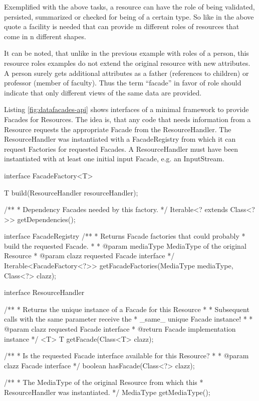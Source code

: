 \documentclass[12pt,a4paper,twoside]{scrartcl}		%
\begin{document}
Exemplified with the above tasks, a resource can have the role of being
validated, persisted, summarized or checked for being of a certain type. So like
in the above quote a facility is needed that can provide m different roles of
resources that come in n different shapes.

It can be noted, that unlike in the previous example with roles of a person,
this resource roles examples do not extend the original resource with new
attributes. A person surely gets additional attributes as a father (references
to children) or professor (member of faculty). Thus the term ``facade'' in favor
of role should indicate that only different views of the same data are provided.

Listing \ref{fig:datafacades-api} shows interfaces of a minimal framework to
provide Facades for Resources. The idea is, that any code that needs information
from a Resource requests the appropriate Facade from the ResourceHandler. The
ResourceHandler was instantiated with a FacadeRegistry from which it can request
Factories for requested Facades. A ResourceHandler must have been instantiated
with at least one initial input Facade, e.g. an InputStream.

\begin{javalisting}[label=fig:datafacades-api,
                    float=p,
                   caption={API of the ResourceFacades component}]
interface FacadeFactory<T> {
 T build(ResourceHandler resourceHandler);

 /**
  * Dependency Facades needed by this factory.
  */
 Iterable<? extends Class<?>> getDependencies();
}

interface FacadeRegistry {
 /**
  * Returns Facade factories that could probably
  * build the requested Facade.
  *
  * @param mediaType MediaType of the original Resource
  * @param clazz requested Facade interface
  */
 Iterable<FacadeFactory<?>> getFacadeFactories(MediaType mediaType,
                                               Class<?> clazz);
}

interface ResourceHandler {
 /**
  * Returns the unique instance of a Facade for this Resource
  *
  * Subsequent calls with the same parameter receive the
  * _same_ unique Facade instance!
  *
  * @param clazz requested Facade interface
  * @return Facade implementation instance
  */
 <T> T getFacade(Class<T> clazz);

 /**
  * Is the requested Facade interface available for this Resource?
  *
  * @param clazz Facade interface
  */
 boolean hasFacade(Class<?> clazz);

 /**
  * The MediaType of the original Resource from which this 
  * ResourceHandler was instantiated.
  */
 MediaType getMediaType();
}
\end{javalisting}
\end{document}
